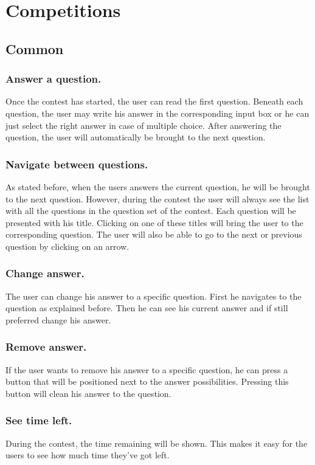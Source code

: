 \section{Competitions}

\subsection{Common}

\subsubsection{Answer a question.} 
Once the contest has started, the user can read the first question. Beneath each question, the user may write his answer in the corresponding input box or he can just select the right answer in case of multiple choice. After answering the question, the user will automatically be brought to the next question. 

\subsubsection{Navigate between questions.} 
As stated before, when the users answers the current question, he will be brought to the next question. However, during the contest the user will always see the list with all the questions in the question set of the contest. Each question will be presented with his title. Clicking on one of these titles will bring the user to the corresponding question. The user will also be able to go to the next or previous question by clicking on an arrow. 

\subsubsection{Change answer.} 
The user can change his answer to a specific question. First he navigates to the question as explained before. Then he can see his current answer and if still preferred change his answer. 

\subsubsection{Remove answer.} 
If the user wants to remove his answer to a specific question, he can press a button that will be positioned next to the answer possibilities. Pressing this button will clean his answer to the question. 

\subsubsection{See time left.} 
During the contest, the time remaining will be shown. This makes it easy for the users to see how much time they've got left. 

